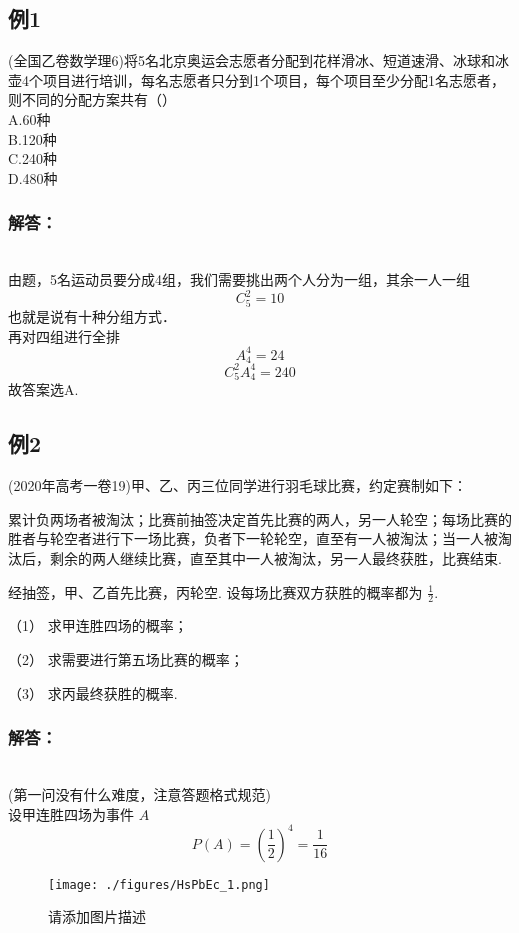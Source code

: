 
\begin{issues}
\issueDraft
\end{issues}
\subsection{例1}
(全国乙卷数学理6)将5名北京奥运会志愿者分配到花样滑冰、短道速滑、冰球和冰壶4个项目进行培训，每名志愿者只分到1个项目，每个项目至少分配1名志愿者，则不同的分配方案共有（）\\
A.60种\\
B.120种\\
C.240种\\
D.480种

\subsubsection{解答：}\\
由题，5名运动员要分成4组，我们需要挑出两个人分为一组，其余一人一组
\begin{equation}
C_5^2 = 10 
\end{equation}
也就是说有十种分组方式．\\
再对四组进行全排
\begin{equation}
A_4^4 = 24
\end{equation}
\begin{equation}
C_5^2A_4^4 =240 
\end{equation}
故答案选A.

\subsection{例2}
(2020年高考一卷19)甲、乙、丙三位同学进行羽毛球比赛，约定赛制如下：

累计负两场者被淘汰；比赛前抽签决定首先比赛的两人，另一人轮空；每场比赛的胜者与轮空者进行下一场比赛，负者下一轮轮空，直至有一人被淘汰；当一人被淘汰后，剩余的两人继续比赛，直至其中一人被淘汰，另一人最终获胜，比赛结束.

经抽签，甲、乙首先比赛，丙轮空. 设每场比赛双方获胜的概率都为 $\frac{1}{2}$.

（1）  求甲连胜四场的概率；

（2）  求需要进行第五场比赛的概率；

（3）  求丙最终获胜的概率.
\subsubsection{解答：}\\
(第一问没有什么难度，注意答题格式规范)\\
设甲连胜四场为事件 $A$
\begin{equation}
P(A) = (\frac{1}{2})^4 = \frac{1}{16}
\end{equation}

\begin{figure}[ht]
\centering
\texttt{[image: ./figures/HsPbEc\_1.png]}
\caption{请添加图片描述} \label{HsPbEc_fig1}
\end{figure}